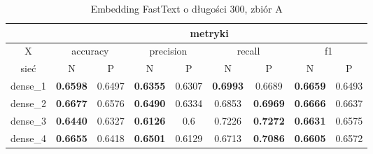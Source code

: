 \begin{table}[p] \centering
    \caption{Embedding FastText o długości 300, zbiór A}
    \label{tab:wyniki_fasttext_A}
    \begin{tabular}{|c|c|c|c|c|c|c|c|c|}    \hline

                 & \multicolumn{8}{c|}{metryki}                                                                                                                                                                                                                                                                                  \\ \hline
        X        & \multicolumn{2}{c|}{accuracy}       & \multicolumn{2}{c|}{precision}      & \multicolumn{2}{c|}{recall}         & \multicolumn{2}{c|}{f1}                                                                                                                                                                     \\ \hline
        sieć     & N                                   & P                                   & N                                   & P                                   & N                                   & P                                   & N                                   & P                                   \\ \hline
        dense\_1 & \textbf{0.6598}                     & 0.6497                              & \textbf{0.6355}                     & 0.6307                              & \textbf{0.6993}                     & 0.6689                              & \textbf{0.6659}                     & 0.6493                              \\ \hline
        dense\_2 & \textbf{0.6677}                     & 0.6576                              & \textbf{0.6490}                     & 0.6334                              & 0.6853                              & \textbf{0.6969}                     & \textbf{0.6666}                     & 0.6637                              \\ \hline
        dense\_3 & \textbf{0.6440}                     & 0.6327                              & \textbf{0.6126}                     & 0.6                                 & 0.7226                              & \textbf{0.7272}                     & \textbf{0.6631}                     & 0.6575                              \\ \hline
        dense\_4 & \textbf{0.6655}                     & 0.6418                              & \textbf{0.6501}                     & 0.6129                              & 0.6713                              & \textbf{0.7086}                     & \textbf{0.6605}                     & 0.6572                              \\ \hline

\end{tabular}
\end{table}
